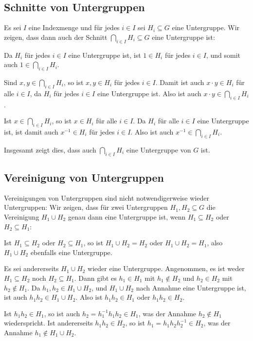 \subsection{Schnitte von Untergruppen}
Es sei $I$ eine Indexmenge und für jedes $i \in I$ sei $H_i \subseteq G$ eine Untergruppe. Wir zeigen, dass dann auch der Schnitt $\bigcap_{i \in I} H_i \subseteq G$ eine Untergruppe ist:

Da $H_i$ für jedes $i \in I$ eine Untergruppe ist, ist $1 \in H_i$ für jedes $i \in I$, und somit auch $1 \in \bigcap_{i \in I} H_i$.

Sind $x,y \in \bigcap_{i \in I} H_i$, so ist $x,y \in H_i$ für jedes $i \in I$. Damit ist auch $x \cdot y \in H_i$ für alle $i \in I$, da $H_i$ für jedes $i \in I$ eine Untergruppe ist. Also ist auch $x \cdot y \in \bigcap_{i \in I} H_i$.

Ist $x \in \bigcap_{i \in I} H_i$, so ist $x \in H_i$ für alle $i \in I$. Da $H_i$ für alle $i \in I$ eine Untergruppe ist, ist damit auch $x^{-1} \in H_i$ für jedes $i \in I$. Also ist auch $x^{-1} \in \bigcap_{i \in I} H_i$.

Insgesamt zeigt dies, dass auch $\bigcap_{i \in I} H_i$ eine Untergruppe von $G$ ist.


\subsection{Vereinigung von Untergruppen}
Vereinigungen von Untergruppen sind nicht notwendigerweise wieder Untergruppen: Wir zeigen, dass für zwei Untergruppen $H_1, H_2 \subseteq G$ die Vereinigung $H_1 \cup H_2$ genau dann eine Untergruppe ist, wenn $H_1 \subseteq H_2$ oder $H_2 \subseteq H_1$:

Ist $H_1 \subseteq H_2$ oder $H_2 \subseteq H_1$, so ist $H_1 \cup H_2 = H_2$ oder $H_1 \cup H_2 = H_1$, also $H_1 \cup H_2$ ebenfalls eine Untergruppe.

Es sei andererseits $H_1 \cup H_2$ wieder eine Untergruppe. Angenommen, es ist weder $H_1 \subseteq H_2$ noch $H_2 \subseteq H_1$. Dann gibt es $h_1 \in H_1$ mit $h_1 \notin H_2$ und $h_2 \in H_2$ mit $h_2 \notin H_1$. Da $h_1, h_2 \in H_1 \cup H_2$, und $H_1 \cup H_2$ nach Annahme eine Untergruppe ist, ist auch $h_1 h_2 \in H_1 \cup H_2$. Also ist $h_1 h_2 \in H_1$ oder $h_1 h_2 \in H_2$.

Ist $h_1 h_2 \in H_1$, so ist auch $h_2 = h_1^{-1} h_1 h_2 \in H_1$, was der Annahme $h_2 \notin H_1$ wiederspricht. Ist andererseits $h_1 h_2 \in H_2$, so ist $h_1 = h_1 h_2 h_2^{-1} \in H_2$, was der Annahme $h_1 \notin H_1 \cup H_2$.

